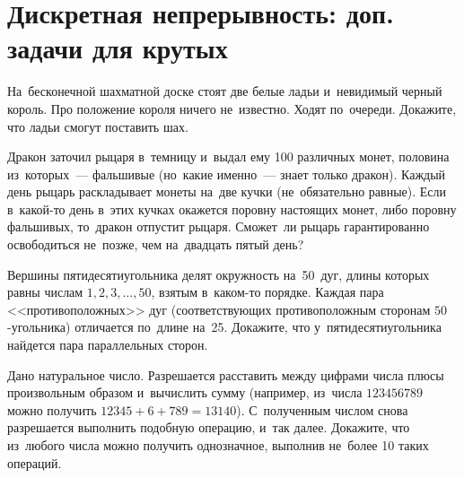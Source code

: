 
\section*{Дискретная непрерывность: доп. задачи для крутых}




\begin{problems}

На~бесконечной шахматной доске стоят две белые ладьи и~невидимый черный король.
Про положение короля ничего не~известно.
Ходят по~очереди.
Докажите, что ладьи смогут поставить шах.

Дракон заточил рыцаря в~темницу и~выдал ему 100 различных монет, половина
из~которых~--- фальшивые (но~какие именно~--- знает только дракон).
Каждый день рыцарь раскладывает монеты на~две кучки (не~обязательно равные).
Если в~какой-то день в~этих кучках окажется поровну настоящих монет, либо
поровну фальшивых, то~дракон отпустит рыцаря.
Сможет~ли рыцарь гарантированно освободиться не~позже, чем на~двадцать пятый
день?


Вершины пятидесятиугольника делят окружность на~50~дуг, длины которых равны
числам $1, 2, 3, \ldots, 50$, взятым в~каком-то порядке.
Каждая пара <<противоположных>> дуг (соответствующих противоположным сторонам
$50$-угольника) отличается по~длине на~25.
Докажите, что у~пятидесятиугольника найдется пара параллельных сторон.

Дано натуральное число.
Разрешается расставить между цифрами числа плюсы произвольным образом
и~вычислить сумму (например, из~числа $123456789$ можно получить
$12345 + 6 + 789 = 13140$).
С~полученным числом снова разрешается выполнить подобную операцию, и~так далее.
Докажите, что из~любого числа можно получить однозначное, выполнив не~более
10 таких операций.

\end{problems}

